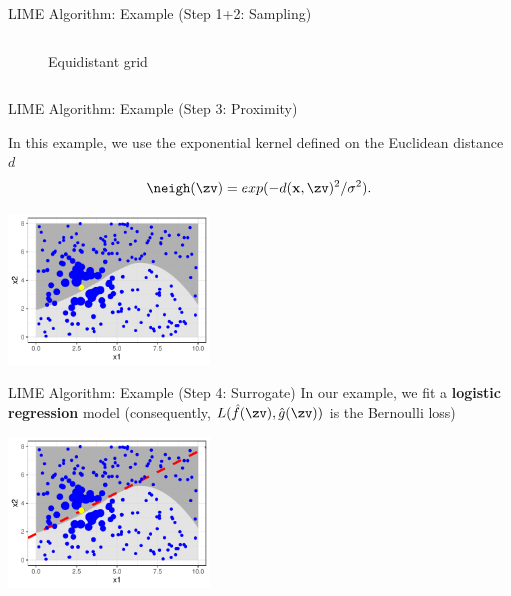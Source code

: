 \documentclass[10pt,compress,t,notes=noshow, xcolor=table]{beamer}
\newcommand{\gh}{\hat{g}}
\begin{document}
\begin{frame}[c]{LIME Algorithm: Example (Step 1+2: Sampling) }
\begin{columns}
\begin{column}{0.5\textwidth}
\begin{figure}
			  \vspace{-0.3cm}
    		    \caption{Equidistant grid}
    		\end{figure}   
    \end{column}
\end{columns}
\end{frame}
		
\begin{frame}{LIME Algorithm: Example (Step 3: Proximity) }

	In this example, we use the exponential kernel defined on the Euclidean distance $d$
		 $$\neigh(\zv) = exp(-d(\xv, \zv)^2/\sigma^2).$$ 
		\begin{center}
			\includegraphics[width=0.4\textwidth]{figure/lime4}
		\end{center}
		
		
\end{frame}
		
\begin{frame}[c]{LIME Algorithm: Example (Step 4: Surrogate) }
		In our example, we fit a \textbf{logistic regression} model (consequently, $L(\fh(\zv), \gh(\zv))$ is the Bernoulli loss)
		\begin{center}
			\includegraphics[width=0.4\textwidth]{figure/lime5}
		\end{center}
\end{frame}

\endlecture
\end{document}
